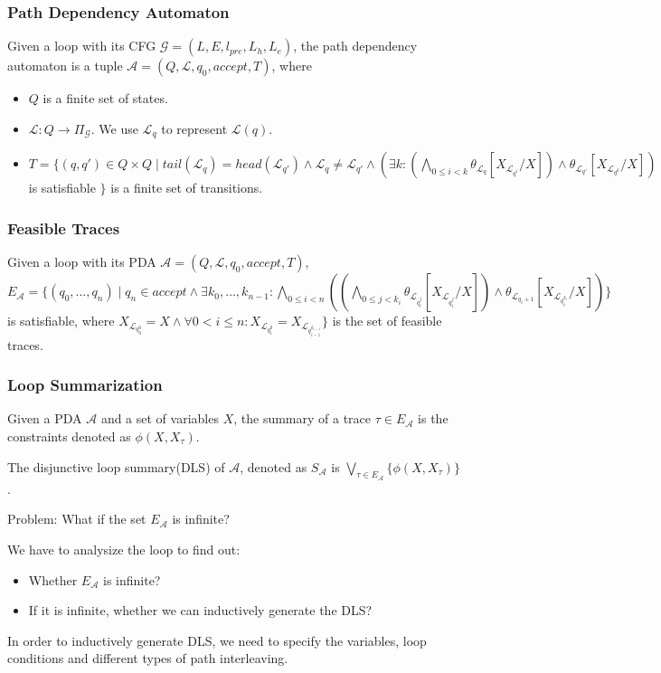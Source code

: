 \documentclass[11pt]{beamer}
\begin{document}
\begin{frame}\frametitle{Path Dependency Automaton}
\begin{definition}[PDA]
Given a loop with its CFG $\mathcal{G} = (L, E, l_{pre}, L_h, L_e)$, the path dependency automaton is a tuple $\mathcal{A} = (Q, \mathcal{L}, q_0, accept, T)$, where
\begin{itemize}
\item $Q$ is a finite set of states.
\item $\mathcal{L}: Q\rightarrow \Pi_\mathcal{G}$. We use $\mathcal{L}_q$ to represent $\mathcal{L}(q)$.
\item $T = \{(q, q')\in Q\times Q\mid tail(\mathcal{L}_q) = head(\mathcal{L}_{q'}) \wedge \mathcal{L}_q \neq \mathcal{L}_{q'} \wedge (\exists k: (\bigwedge_{0 \le i  < k} \theta_{\mathcal{L}_q}[X_{\mathcal{L}_{q^i}}/X]) \wedge \theta_{\mathcal{L}_{q'}}[X_{\mathcal{L}_{q^k}}/ X])$ is satisfiable $\}$  is a finite set of transitions.
\end{itemize}
\end{definition}
\end{frame}
\begin{frame}\frametitle{Feasible Traces}
\begin{definition}[Traces]
Given a loop with its PDA $\mathcal{A} = (Q, \mathcal{L}, q_0, accept, T)$, $E_\mathcal{A} = \{(q_0, \ldots, q_n)\mid q_n\in accept \wedge \exists k_0, \ldots, k_{n-1}:\bigwedge_{0 \le i < n }((\bigwedge_{0 \le j < k_i}\theta_{\mathcal{L}_{q_i^j}}[X_{\mathcal{L}_{q_i^j}}/ X]) \wedge \theta_{\mathcal{L}_{q_i + 1}}[X_{\mathcal{L}_{q_i^{k_i}}}/ X])\}$ is satisfiable, where $X_{\mathcal{L}_{q_0^0}} = X\wedge \forall 0 < i \le n: X_{\mathcal{L}_{q_i^0}} = X_{\mathcal{L}_{q_{i - 1}^{k_{i - 1}}}}\}$ is the set of feasible traces.

\end{definition}

\end{frame}
\begin{frame}\frametitle{Loop Summarization}
\begin{definition}
Given a PDA $\mathcal{A}$ and a set of variables $X$, the summary of a trace $\tau\in E_\mathcal{A}$ is the constraints denoted as $\phi(X, X_\tau)$.

The disjunctive loop summary(DLS) of $\mathcal{A}$, denoted as $S_\mathcal{A}$ is $\bigvee_{\tau\in E_\mathcal{A}}\{\phi(X, X_\tau)\}$.
\end{definition}


Problem: What if the set $E_\mathcal{A}$ is infinite?

We have to analysize the loop to find out:
\begin{itemize}
\item Whether $E_\mathcal{A}$ is infinite?
\item If it is infinite, whether we can inductively generate the DLS?

\end{itemize}
In order to inductively generate DLS, we need to specify the variables, loop conditions and different types of path interleaving.
\end{frame}
\end{document}
